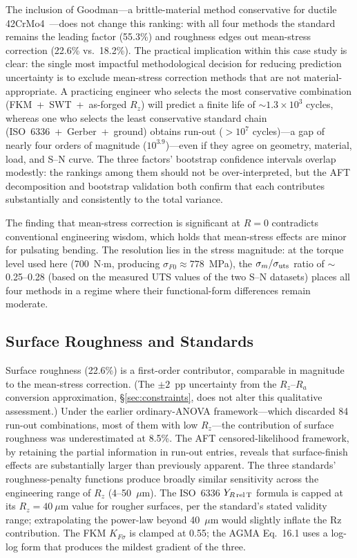 \documentclass[twocolumn,12pt,a4paper]{article}
\begin{document}
The inclusion of Goodman---a brittle-material method conservative for
ductile 42CrMo4~\cite{stephens2001}---does not change this ranking:
with all four methods the standard remains the leading factor (55.3\%)
and roughness edges out mean-stress correction (22.6\% vs.\ 18.2\%).
The practical
implication within this case study is clear: the single most impactful
methodological decision
for reducing prediction uncertainty is to exclude mean-stress correction
methods that are not material-appropriate. A practicing engineer who selects the most conservative
combination
(FKM~+~SWT~+~as-forged $R_z$) will predict a finite life of
$\sim$$1.3\times10^{3}$ cycles, whereas one who selects the least
conservative standard chain (ISO~6336~+~Gerber~+~ground) obtains
run-out ($>10^7$ cycles)---a gap of nearly four orders of
magnitude ($10^{3.9}$)---even if they agree on geometry, material,
load, and S--N curve. The three factors' bootstrap confidence intervals
overlap modestly: the rankings among them should not be over-interpreted,
but the AFT decomposition and bootstrap validation both confirm that each
contributes substantially and consistently to the total variance.

The finding that mean-stress correction is significant at $R=0$
contradicts conventional engineering wisdom, which holds that
mean-stress effects are minor for pulsating bending. The resolution lies
in the stress magnitude: at the torque level used here (700~N$\cdot$m,
producing $\sigma_{F0} \approx 778$~MPa), the $\sigma_m/\sigma_{\rm uts}$
ratio of $\sim$0.25--0.28 (based on the measured UTS values of the two
S--N datasets) places all four methods in a regime where their
functional-form differences remain moderate.

\subsection{Surface Roughness and Standards}

Surface roughness (22.6\%) is a first-order contributor, comparable in
magnitude to the mean-stress correction. (The $\pm 2$~pp uncertainty
from the $R_z$--$R_a$ conversion approximation,
\S\ref{sec:constraints}, does not alter this qualitative assessment.)
Under the earlier ordinary-ANOVA
framework---which discarded 84 run-out combinations, most of them with
low $R_z$---the contribution of surface roughness was underestimated at
8.5\%. The AFT censored-likelihood framework, by retaining the partial
information in run-out entries, reveals that surface-finish effects are
substantially larger than previously apparent. The three standards'
roughness-penalty functions produce broadly similar sensitivity across
the engineering range of $R_z$ (4--50~$\mu$m). The ISO~6336
$Y_{R\,\rm rel\,T}$ formula is capped at its $R_z=40~\mu$m value for
rougher surfaces, per the standard's stated validity range; extrapolating
the power-law beyond 40~$\mu$m would slightly inflate the Rz contribution.
The FKM $K_{F\sigma}$ is clamped at 0.55; the AGMA Eq.~16.1 uses a
log-log form that produces the mildest gradient of the three.
\end{document}
